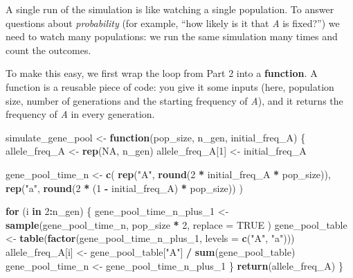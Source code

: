 \documentclass[
  a4paper]{book}
\newenvironment{Shaded}{\begin{snugshade}}{\end{snugshade}}
\newcommand{\AttributeTok}[1]{\textcolor[rgb]{0.13,0.29,0.53}{#1}}
\newcommand{\ConstantTok}[1]{\textcolor[rgb]{0.56,0.35,0.01}{#1}}
\newcommand{\ControlFlowTok}[1]{\textcolor[rgb]{0.13,0.29,0.53}{\textbf{#1}}}
\newcommand{\DecValTok}[1]{\textcolor[rgb]{0.00,0.00,0.81}{#1}}
\newcommand{\FunctionTok}[1]{\textcolor[rgb]{0.13,0.29,0.53}{\textbf{#1}}}
\newcommand{\NormalTok}[1]{#1}
\newcommand{\OtherTok}[1]{\textcolor[rgb]{0.56,0.35,0.01}{#1}}
\newcommand{\SpecialCharTok}[1]{\textcolor[rgb]{0.81,0.36,0.00}{\textbf{#1}}}
\newcommand{\StringTok}[1]{\textcolor[rgb]{0.31,0.60,0.02}{#1}}
\begin{document}
A single run of the simulation is like watching a single population. To answer questions about \emph{probability} (for example, ``how likely is it that \emph{A} is fixed?'') we need to watch many populations: we run the same simulation many times and count the outcomes.

To make this easy, we first wrap the loop from Part 2 into a \textbf{function}. A function is a reusable piece of code: you give it some inputs (here, population size, number of generations and the starting frequency of \emph{A}), and it returns the frequency of \emph{A} in every generation.

\begin{Shaded}
\begin{Highlighting}[]
\NormalTok{simulate\_gene\_pool }\OtherTok{\textless{}{-}} \ControlFlowTok{function}\NormalTok{(pop\_size, n\_gen, initial\_freq\_A) \{}
\NormalTok{  allele\_freq\_A }\OtherTok{\textless{}{-}} \FunctionTok{rep}\NormalTok{(}\ConstantTok{NA}\NormalTok{, n\_gen)}
\NormalTok{  allele\_freq\_A[}\DecValTok{1}\NormalTok{] }\OtherTok{\textless{}{-}}\NormalTok{ initial\_freq\_A}

\NormalTok{  gene\_pool\_time\_n }\OtherTok{\textless{}{-}} \FunctionTok{c}\NormalTok{(}
    \FunctionTok{rep}\NormalTok{(}\StringTok{"A"}\NormalTok{, }\FunctionTok{round}\NormalTok{(}\DecValTok{2} \SpecialCharTok{*}\NormalTok{ initial\_freq\_A }\SpecialCharTok{*}\NormalTok{ pop\_size)),}
    \FunctionTok{rep}\NormalTok{(}\StringTok{"a"}\NormalTok{, }\FunctionTok{round}\NormalTok{(}\DecValTok{2} \SpecialCharTok{*}\NormalTok{ (}\DecValTok{1} \SpecialCharTok{{-}}\NormalTok{ initial\_freq\_A) }\SpecialCharTok{*}\NormalTok{ pop\_size))}
\NormalTok{  )}

  \ControlFlowTok{for}\NormalTok{ (i }\ControlFlowTok{in} \DecValTok{2}\SpecialCharTok{:}\NormalTok{n\_gen) \{}
\NormalTok{    gene\_pool\_time\_n\_plus\_1 }\OtherTok{\textless{}{-}} \FunctionTok{sample}\NormalTok{(gene\_pool\_time\_n,}
\NormalTok{      pop\_size }\SpecialCharTok{*} \DecValTok{2}\NormalTok{,}
      \AttributeTok{replace =} \ConstantTok{TRUE}
\NormalTok{    )}
\NormalTok{    gene\_pool\_table }\OtherTok{\textless{}{-}} \FunctionTok{table}\NormalTok{(}\FunctionTok{factor}\NormalTok{(gene\_pool\_time\_n\_plus\_1,}
                                    \AttributeTok{levels =} \FunctionTok{c}\NormalTok{(}\StringTok{"A"}\NormalTok{, }\StringTok{"a"}\NormalTok{)))}
\NormalTok{    allele\_freq\_A[i] }\OtherTok{\textless{}{-}}\NormalTok{ gene\_pool\_table[}\StringTok{"A"}\NormalTok{] }\SpecialCharTok{/} \FunctionTok{sum}\NormalTok{(gene\_pool\_table)}
\NormalTok{    gene\_pool\_time\_n }\OtherTok{\textless{}{-}}\NormalTok{ gene\_pool\_time\_n\_plus\_1}
\NormalTok{  \}}
  \FunctionTok{return}\NormalTok{(allele\_freq\_A)}
\NormalTok{\}}
\end{Highlighting}
\end{Shaded}
\end{document}
